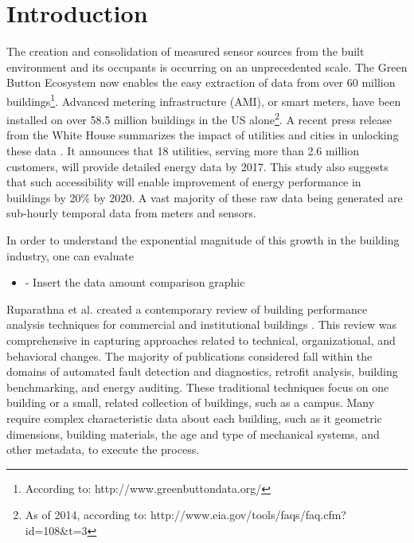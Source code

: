 \section{Introduction}
\label{sec:intro}

The creation and consolidation of measured sensor sources from the built environment and its occupants is occurring on an unprecedented scale. The Green Button Ecosystem now enables the easy extraction of data from over 60 million buildings\footnote{According to: http://www.greenbuttondata.org/}. Advanced metering infrastructure (AMI), or smart meters, have been installed on over 58.5 million buildings in the US alone\footnote{As of 2014, according to: http://www.eia.gov/tools/faqs/faq.cfm?id=108&t=3}. A recent press release from the White House summarizes the impact of utilities and cities in unlocking these data \cite{the_white_house_fact_2016}. It announces that 18 utilities, serving more than 2.6 million customers, will provide detailed energy data by 2017. This study also suggests that such accessibility will enable improvement of energy performance in buildings by 20\% by 2020. A vast majority of these raw data being generated are sub-hourly temporal data from meters and sensors.

In order to understand the exponential magnitude of this growth in the building industry, one can evaluate

\begin{itemize}
\item - Insert the data amount comparison graphic
\end{itemize}

Ruparathna et al. created a contemporary review of building performance analysis techniques for commercial and institutional buildings \cite{ruparathna_improving_2016}. This review was comprehensive in capturing approaches related to technical, organizational, and behavioral changes. The majority of publications considered fall within the domains of automated fault detection and diagnostics, retrofit analysis, building benchmarking, and energy auditing. These traditional techniques focus on one building or a small, related collection of buildings, such as a campus. Many require complex characteristic data about each building, such as it geometric dimensions, building materials, the age and type of mechanical systems, and other metadata, to execute the process. 

